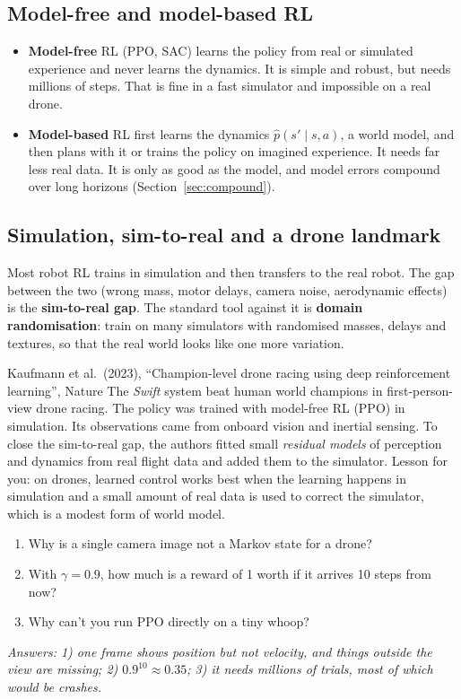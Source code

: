 \subsection{Model-free and model-based RL}
\begin{itemize}
\item \textbf{Model-free} RL (PPO, SAC) learns the policy from real or simulated experience and never learns the dynamics. It is simple and robust, but needs millions of steps. That is fine in a fast simulator and impossible on a real drone.
\item \textbf{Model-based} RL first learns the dynamics $\hat p(s'\mid s,a)$, a world model, and then plans with it or trains the policy on imagined experience. It needs far less real data. It is only as good as the model, and model errors compound over long horizons (Section~\ref{sec:compound}).
\end{itemize}

\subsection{Simulation, sim-to-real and a drone landmark}
Most robot RL trains in simulation and then transfers to the real robot. The gap between the two (wrong mass, motor delays, camera noise, aerodynamic effects) is the \textbf{sim-to-real gap}. The standard tool against it is \textbf{domain randomisation}: train on many simulators with randomised masses, delays and textures, so that the real world looks like one more variation.

\begin{paperbox}{Kaufmann et al.\ (2023), ``Champion-level drone racing using deep reinforcement learning'', Nature}
The \emph{Swift} system beat human world champions in first-person-view drone racing. The policy was trained with model-free RL (PPO) in simulation. Its observations came from onboard vision and inertial sensing. To close the sim-to-real gap, the authors fitted small \emph{residual models} of perception and dynamics from real flight data and added them to the simulator. Lesson for you: on drones, learned control works best when the learning happens in simulation and a small amount of real data is used to correct the simulator, which is a modest form of world model.
\end{paperbox}

\begin{quizbox}
\begin{enumerate}[leftmargin=*]
\item Why is a single camera image not a Markov state for a drone?
\item With $\gamma=0.9$, how much is a reward of 1 worth if it arrives 10 steps from now?
\item Why can't you run PPO directly on a tiny whoop?
\end{enumerate}
\emph{Answers: 1) one frame shows position but not velocity, and things outside the view are missing; 2) $0.9^{10}\approx0.35$; 3) it needs millions of trials, most of which would be crashes.}
\end{quizbox}

